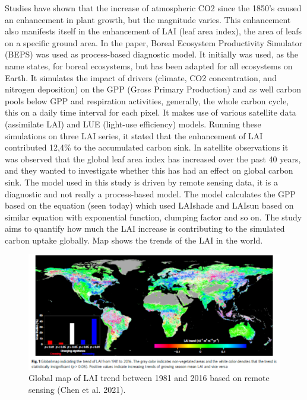 \documentclass[12pt,oneside]{book}
\begin{document}
Studies have shown that the increase of atmospheric CO2 since the 1850's
caused an enhancement in plant growth, but the magnitude varies. This
enhancement also manifests itself in the enhancement of LAI (leaf area
index), the area of leafs on a specific ground area. In the paper,
Boreal Ecosystem Productivity Simulator (BEPS) was used as process-based
diagnostic model. It initially was used, as the name states, for boreal
ecosystems, but has been adapted for all ecosystems on Earth. It
simulates the impact of drivers (climate, CO2 concentration, and
nitrogen deposition) on the GPP (Gross Primary Production) and as well
carbon pools below GPP and respiration activities, generally, the whole
carbon cycle, this on a daily time interval for each pixel. It makes use
of various satellite data (assimilate LAI) and LUE (light-use
efficiency) models. Running these simulations on three LAI series, it
stated that the enhancement of LAI contributed 12,4\% to the accumulated
carbon sink. In satellite observations it was observed that the global
leaf area index has increased over the past 40 years, and they wanted to
investigate whether this has had an effect on global carbon sink. The
model used in this study is driven by remote sensing data, it is a
diagnostic and not really a process-based model. The model calculates
the GPP based on the equation (seen today) which used LAIshade and
LAIsun based on similar equation with exponential function, clumping
factor and so on. The study aims to quantify how much the LAI increase
is contributing to the simulated carbon uptake globally. Map shows the
trends of the LAI in the world.

\begin{figure}

{\centering \includegraphics[width=0.8\linewidth]{figures/chap3/f334_chen1} 

}

\caption{Global map of LAI trend between 1981 and 2016 based on remote sensing (Chen et al. 2021).}\label{fig:f334}
\end{figure}
\end{document}
